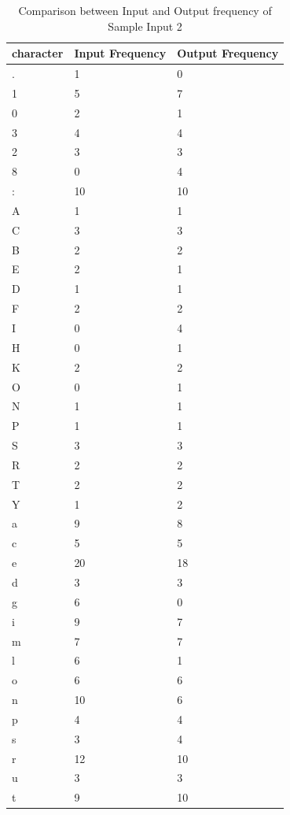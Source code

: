 \begin{table}[H]
\centering
\begin{tabular}{|p{2cm}|p{2cm}|p{2cm}|}
\hline
character & Input Frequency & Output Frequency \\
\hline
. & 1 & 0\\
\hline
1 & 5 & 7\\
\hline
0 & 2 & 1\\
\hline
3 & 4 & 4\\
\hline
2 & 3 & 3\\
\hline
8 & 0 & 4\\
\hline
: & 10 & 10\\
\hline
A & 1 & 1\\
\hline
C & 3 & 3\\
\hline
B & 2 & 2\\
\hline
E & 2 & 1\\
\hline
D & 1 & 1\\
\hline
F & 2 & 2\\
\hline
I & 0 & 4\\
\hline
H & 0 & 1\\
\hline
K & 2 & 2\\
\hline
O & 0 & 1\\
\hline
N & 1 & 1\\
\hline
P & 1 & 1\\
\hline
S & 3 & 3\\
\hline
R & 2 & 2\\
\hline
T & 2 & 2\\
\hline
Y & 1 & 2\\
\hline
a & 9 & 8\\
\hline
c & 5 & 5\\
\hline
e & 20 & 18\\
\hline
d & 3 & 3\\
\hline
g & 6 & 0\\
\hline
i & 9 & 7\\
\hline
m & 7 & 7\\
\hline
l & 6 & 1\\
\hline
o & 6 & 6\\
\hline
n & 10 & 6\\
\hline
p & 4 & 4\\
\hline
s & 3 & 4\\
\hline
r & 12 & 10\\
\hline
u & 3 & 3\\
\hline
t & 9 & 10\\
\hline
\end{tabular}
\caption {Comparison between Input and Output frequency of Sample Input 2}
\label {tab:Table2}
\end{table}

